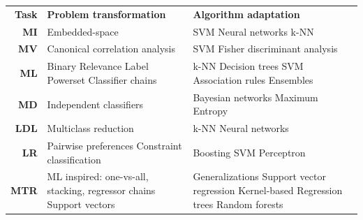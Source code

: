 \begin{table}[ht]
\centering\scriptsize
\setlength{\tabcolsep}{0.55em}
\renewcommand{\arraystretch}{1.4}
\begin{tabular}{r p{} p{}}
\toprule
\textbf{Task} & \textbf{Problem transformation} & \textbf{Algorithm adaptation} \\ \cmidrule{1-3}
\textbf{MI} & 
Embedded-space \cite{mic-taxonomy} & 
SVM \cite{mi-svm,mi-kernel}\newline Neural networks \cite{mi-nn}\newline k-NN \cite{mi-knn} \\
\textbf{MV} & 
Canonical correlation analysis \cite{mv-cca}& 
SVM \cite{mv-svm} \newline Fisher discriminant analysis \cite{mv-fda}\\
\textbf{ML} & 
Binary Relevance \cite{mlmethods} \newline Label Powerset \cite{mlmethods} \newline Classifier chains \cite{ml-chains} & 
k-NN \cite{ml-knn} \newline Decision trees \cite{ml-dt}\newline SVM \cite{ml-svm} \newline Association rules \cite{ml-rules} \newline Ensembles \cite{mlensembles}\\
\textbf{MD} & 
Independent classifiers \cite{mdc,mdc-indep} & 
Bayesian networks \cite{md-bayes,md-bayes2}\newline Maximum Entropy \cite{mdc,mdc-indep} \\
\textbf{LDL} & 
Multiclass reduction \cite{ldl} & 
k-NN \cite{ldl} \newline Neural networks \cite{ldl}\\
\textbf{LR} & 
Pairwise preferences \cite{lrankpairwise} \newline Constraint classification \cite{lr-constraint} &
Boosting \cite{lr-boost} \newline SVM \cite{lranksurvey} \newline Perceptron \cite{lr-online}\\
\textbf{MTR} &
ML {inspired: one-vs-all, stacking, regressor chains} \cite{mtrviaml} \newline Support vectors \cite{mtr-lssvr}& 
Generalizations \cite{mtr-rank,mtr-canon} \newline Support vector regression \cite{mtr-svr1,mtr-svr2}\newline Kernel-based \cite{mtr-kern1,mtr-kern2} \newline Regression trees \cite{mtr-trees} \newline Random forests \cite{mtr-rf}\\

\end{tabular}
\end{table}
